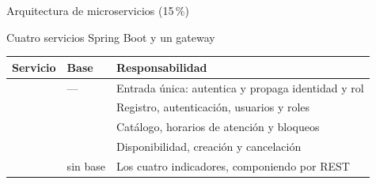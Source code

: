 %
%

%
       {Arquitectura de microservicios (15\,\%)}

\begin{frame}{Cuatro servicios Spring Boot y un gateway}

  \begin{center}
    \scriptsize
    \setlength{\tabcolsep}{4pt}
    \renewcommand{\arraystretch}{1.05}
    \begin{tabular}{@{}llL{5.6cm}@{}}
      \toprule
      \textbf{Servicio} & \textbf{Base} & \textbf{Responsabilidad}\\
      \midrule
       & ---               & Entrada única: autentica y propaga identidad y rol\\
       &  & Registro, autenticación, usuarios y roles\\
        &   & Catálogo, horarios de atención y bloqueos\\
       &  & Disponibilidad, creación y cancelación\\
       & \alert{sin base}  & Los cuatro indicadores, componiendo por REST\\
      \bottomrule
    \end{tabular}
  \end{center}


\end{frame}
